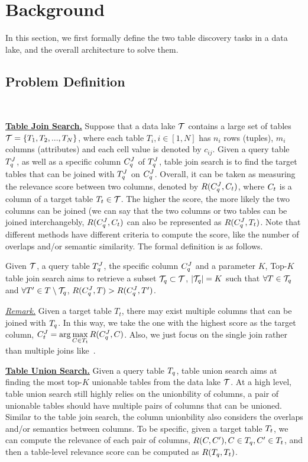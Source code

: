 \section{Background} 
In this section, we first formally define the two table discovery tasks in a data lake, and the overall architecture to solve them.

\subsection{Problem Definition}~\label{subsec:def}


\noindent\textbf{\underline{Table Join Search.}}
Suppose that a data lake $\mathcal{T}$ contains a large set of tables $\mathcal{T}=\{T_1, T_2, ..., T_N\}$, where each table $T_i, i \in [1,N]$ has $n_i$ rows (tuples), $m_i$ columns (attributes) and each cell value is denoted by $c_{ij}$.  Given a query table $T^J_q$, as well as a specific column $C^J_q$ of $T^J_q$, table join search is to find the target tables that can be joined with  $T^J_q$ on $C^J_q$.
%
Overall, it can be taken as measuring the relevance score between two columns, denoted by $R(C^J_q, C_t)$, where   $C_t$ is a column  of a target table $T_t \in \mathcal{T}$. The higher the score, the more likely the two columns can be joined (we can say that the two columns or two tables can be joined interchangebly, \ie $R(C^J_q, C_t)$  can also be represented as $R(C^J_q, T_t)$.
Note that different methods have different criteria to compute the score, like the number of overlaps and/or semantic similarity.
 The formal definition is as follows. 

\begin{definition}
	Given $\mathcal{T}$, a query table $T^J_q$, the specific column $C^J_q$ and a parameter $K$, Top-$K$ table join search aims to retrieve a subset $\mathcal{T}_q \subset \mathcal{T}$, $|\mathcal{T}_q|=K$ such that $\forall T \in \mathcal{T}_q$ and $\forall T' \in T \setminus \mathcal{T}_q$, $R(C^J_q, T)>R(C^J_q, T')$.
\end{definition}

\noindent \underline{\textit{Remark.}} Given a target table $T_t$, there may exist multiple columns that can be joined with $T_q$. In this way,  we  take the one with the highest score as the target column, \ie $C^J_t=\arg\max\limits_{C\in T_t} R(C^J_q, C)$. Also, we just focus on the single join rather than multiple joins like~\cite{}.

\noindent\textbf{\underline{Table Union Search.}} Given a query table $T_q$,  table union search aims at finding the most top-$K$ unionable tables from the data lake $\mathcal{T}$. At a high level,  table union search still highly relies on   the unionbility of  columns, \ie a pair of unionable tables should have multiple pairs of columns that can be unioned. Similar to the table join search, the column unionbility also considers the overlaps and/or semantics between columns. To be specific, given a target table $T_t$, we can compute the relevance of each pair of columns, \ie   $R(C, C'), C \in T_q, C' \in T_t$, and then a table-level relevance score can be computed as $R(T_q, T_t)$.


